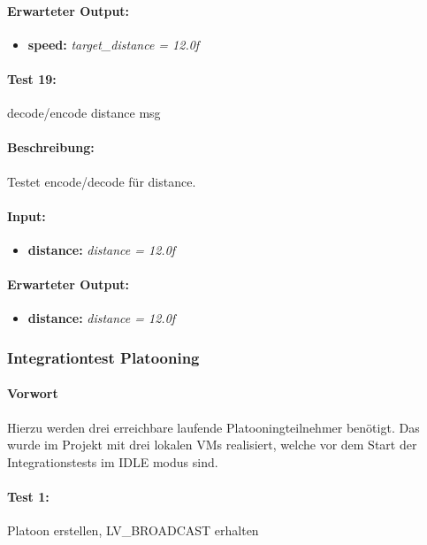 \documentclass[a4paper, 12pt, titlepage]{scrartcl}
\begin{document}
{			\paragraph{Erwarteter Output:}
			\begin{itemize} \itemsep-0.5em
				\item \textbf{speed:} \emph{target\_distance = 12.0f}
			\end{itemize}

			\paragraph{Test 19:}{decode/encode distance msg}
			\paragraph{Beschreibung:} Testet encode/decode für distance.
			\paragraph{Input:}
			\begin{itemize} \itemsep-0.5em
				\item \textbf{distance:} \emph{distance = 12.0f}
			\end{itemize}
			\paragraph{Erwarteter Output:}
			\begin{itemize} \itemsep-0.5em
				\item \textbf{distance:} \emph{distance = 12.0f}
			\end{itemize}

		\subsubsection{Integrationtest Platooning}
			\label{integrationtest_platooning}

			\paragraph{Vorwort}
			Hierzu werden drei erreichbare laufende Platooningteilnehmer benötigt. Das wurde im Projekt mit drei lokalen VMs realisiert, welche vor dem Start der Integrationstests im IDLE modus sind.

			\paragraph{Test 1:}{Platoon erstellen, LV\_BROADCAST erhalten}
}
\end{document}
